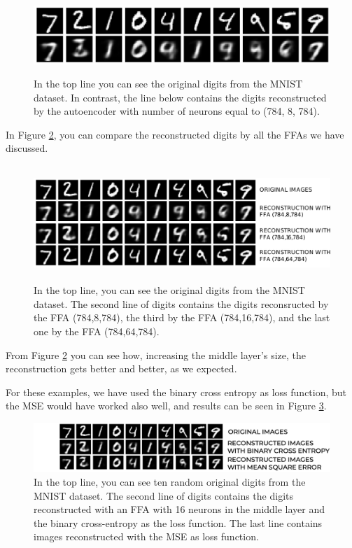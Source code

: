 \documentclass[12pt,a4]{article}
\begin{document}
\begin{figure}[hbt]
\centering
\includegraphics[width=12.61cm,height=2.92cm]{./images/image8.png}
\caption{In the top line you can see the original digits from the MNIST dataset. In contrast, the line below contains the digits reconstructed by the autoencoder with number of neurons equal to (784, 8, 784).
}\label{fig:rec_4}
\end{figure}
In Figure \ref{fig:rec_5}, you can compare the reconstructed digits by all the FFAs we have discussed.
\begin{figure}[hbt]
\centering
\includegraphics[width=12.61cm,height=4.36cm]{./images/image9.pdf}
\caption{In the top line, you can see the original digits from the MNIST dataset. The second line of digits contains the digits reconsructed by the FFA (784,8,784), the third by the FFA (784,16,784), and the last one by the FFA (784,64,784).}\label{fig:rec_5}
\end{figure}
From Figure \ref{fig:rec_5} you can see how, increasing the middle layer's size, the reconstruction gets better and better, as we expected. 


For these examples, we have used the binary cross entropy as loss function, but the MSE would have worked also well, and results can be seen in Figure \ref{fig:rec_6}.
\begin{figure}[hbt]
\label{fig:rec_6}
\centering
\includegraphics[width=12.6cm]{./images/image10.png}
\caption{In the top line, you can see ten random original digits from the MNIST dataset. The second line of digits contains the digits reconstructed with an FFA with 16 neurons in the middle layer and the binary cross-entropy as the loss function. The last line contains images reconstructed with the MSE as loss function.}
\end{figure}
\end{document}
